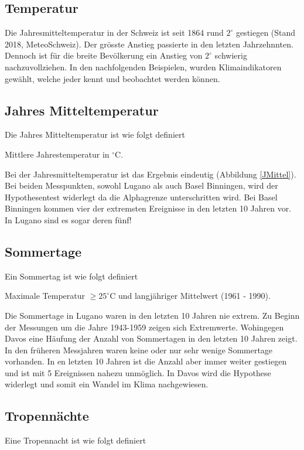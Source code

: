 \begin{refsection}
\section{Temperatur}
Die Jahresmitteltemperatur in der Schweiz ist seit 1864 rund $2^{\circ}$ gestiegen (Stand 2018, MeteoSchweiz). Der grösste Anstieg passierte in den letzten Jahrzehnnten. Dennoch ist für die breite Bevölkerung ein Anstieg von $2^{\circ}$ schwierig nachzuvollziehen.
In den nachfolgenden Beispielen, wurden Klimaindikatoren gewählt, welche jeder kennt und beobachtet werden können.

\subsection{Jahres Mitteltemperatur}
Die Jahres Mitteltemperatur ist wie folgt definiert

\begin{definition}
Mittlere Jahrestemperatur in $^{\circ}$C.
\end{definition}

Bei der Jahresmitteltemperatur ist das Ergebnis eindeutig (Abbildung \ref{JMittel}). Bei beiden Messpunkten, sowohl Lugano als auch Basel Binningen, wird der Hypothesentest widerlegt da die Alphagrenze unterschritten wird. Bei Basel Binningen kommen vier der extremsten Ereignisse in den letzten 10 Jahren vor. In Lugano sind es sogar deren fünf! 


\subsection{Sommertage}
Ein Sommertag ist wie folgt definiert

\begin{definition}
Maximale Temperatur $\ge 25^{\circ}$C und langjähriger Mittelwert (1961 - 1990).
\end{definition}

Die Sommertage in Lugano waren in den letzten 10 Jahren nie extrem. Zu Beginn der Messungen um die Jahre 1943-1959 zeigen sich Extremwerte. Wohingegen Davos eine Häufung der Anzahl von Sommertagen in den letzten 10 Jahren zeigt. In den früheren Messjahren waren keine oder nur sehr wenige Sommertage vorhanden. In en letzten 10 Jahren ist die Anzahl aber immer weiter gestiegen und ist mit 5 Ereignissen nahezu unmöglich. In Davos wird die Hypothese widerlegt und somit ein Wandel im Klima nachgewiesen.


\subsection{Tropennächte}
Eine Tropennacht ist wie folgt definiert


\end{refsection}
